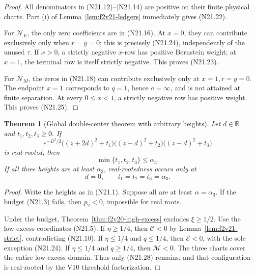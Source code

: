 \documentclass[11pt]{article}
\newtheorem{theorem}{Theorem}[section]
\theoremstyle{definition}
\theoremstyle{remark}
\begin{document}
\begin{proof}
All denominators in \textup{(N21.12)}--\textup{(N21.14)} are positive
on their finite physical charts.  Part \textup{(i)} of
Lemma~\ref{lem:f2v21-ledgers} immediately gives
\textup{(N21.22)}.

For \(\mathcal N_E\), the only zero coefficients are in
\textup{(N21.16)}.  At \(x=0\), they can contribute exclusively only
when \(r=y=0\); this is precisely \textup{(N21.24)}, independently of the
unused \(\tau\).  If \(x>0\), a strictly negative \(x\)-row has positive
Bernstein weight; at \(x=1\), the terminal row is itself strictly negative.
This proves \textup{(N21.23)}.

For \(\mathcal N_M\), the zeros in \textup{(N21.18)} can contribute
exclusively only at \(x=1,r=y=0\).  The endpoint \(x=1\) corresponds to
\(q=1\), hence \(a=\infty\), and is not attained at finite separation.
At every \(0\leq x<1\), a strictly negative row has positive weight.
This proves \textup{(N21.25)}.
\end{proof}

\begin{theorem}[Global double-center theorem with arbitrary heights]
\label{thm:f2v21-double-center-all-heights}
Let \(d\in\mathbb R\) and \(t_1,t_2,t_3\geq0\).  If
\[
 e^{-D^2/2}
 \bigl((z+2d)^2+t_1\bigr)
 \bigl((z-d)^2+t_2\bigr)
 \bigl((z-d)^2+t_3\bigr)
 \tag{N21.26}
\]
is real-rooted, then
\[
 \min\{t_1,t_2,t_3\}\leq\alpha_3.
 \tag{N21.27}
\]
If all three heights are at least \(\alpha_3\), real-rootedness occurs
only at
\[
 d=0,\qquad t_1=t_2=t_3=\alpha_3.
 \tag{N21.28}
\]
\end{theorem}

\begin{proof}
Write the heights as in \textup{(N21.1)}.  Suppose all are at least
\(\alpha=\alpha_3\).  If the budget \textup{(N21.3)} fails, then
\(p_2<0\), impossible for real roots.

Under the budget, Theorem~\ref{thm:f2v20-high-excess} excludes
\(\xi\geq1/2\).  Use the low-excess coordinates \textup{(N21.5)}.
If \(\eta\geq1/4\), then \(\mathcal C<0\) by
Lemma~\ref{lem:f2v21-strict}, contradicting
\textup{(N21.10)}.  If \(\eta\leq1/4\) and \(q\leq1/4\), then
\(\mathcal E<0\), with the sole exception \textup{(N21.24)}.  If
\(\eta\leq1/4\) and \(q\geq1/4\), then \(\mathcal M<0\).
The three charts cover the entire low-excess domain.  Thus only
\textup{(N21.28)} remains, and that configuration is real-rooted by the
V10 threshold factorization.
\end{proof}
\end{document}
